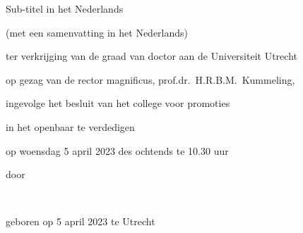 \begin{titlepage}
\begin{center}
                {\Large\titlefont\titleshape Sub-titel in het Nederlands}

                (met een samenvatting in het Nederlands)

		\bigskip
		\bigskip

		ter verkrijging van de graad van doctor aan de Universiteit Utrecht

		op gezag van de rector magnificus, prof.dr.\ H.R.B.M.~Kummeling,

		ingevolge het besluit van het college voor promoties

		in het openbaar te verdedigen

                op woensdag 5 april 2023  des ochtends te 10.30 uur%

		\bigskip
		\bigskip

		door

		\bigskip
		\bigskip

		{\makeatletter
		\Large\titlefont\bfseries\@firstname~{\titleshape\@lastname}
		\makeatother}

		\bigskip
		\bigskip

       		geboren op 5 april 2023 te Utrecht

		\vspace*{2\bigskipamount}

	\end{center}





\end{titlepage}

